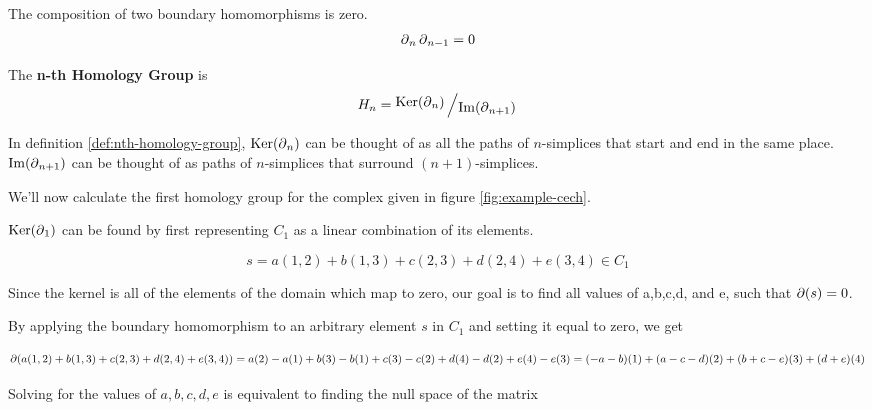 {\begin{theorem}\label{thm:homology-composition}
    The composition of two boundary homomorphisms is zero.
    \begin{align*}
		\operatorname{\partial}_n \operatorname{\partial}_{n-1} = 0
	\end{align*}
\end{theorem}

\begin{definition}\label{def:nth-homology-group}
    The \textbf{n-th Homology Group} is \[H_n = \bigslant{\Ker(\boundary_n)}{\Ima(\boundary_{n+1})}\]
    \cite{fraleigha}
\end{definition}

In definition \ref{def:nth-homology-group}, \(\operatorname{Ker}(\operatorname{\partial}_n)\) can be thought of as all the paths of \(n\)-simplices that start and end in the same place.
\(\operatorname{Im}(\operatorname{\partial}_{n+1})\) can be thought of as paths of \(n\)-simplices that surround \((n+1)\)-simplices.

\begin{figure}
    \scalebox{.8}{
        
    }
    \caption{}
    \label{fig:homology-groups}
\end{figure}

\begin{example}
    We'll now calculate the first homology group for the complex given in figure \ref{fig:example-cech}.

    \(\operatorname{Ker}(\operatorname{\partial}_1)\) can be found by first representing \(C_1\) as a linear combination of its elements.

    \[s = a(1,2) + b(1,3) + c(2,3) + d(2,4) + e(3,4) \in C_1\]

    Since the kernel is all of the elements of the domain which map to zero, our goal is to find all values of a,b,c,d, and e, such that \(\operatorname{\partial}(s) = 0\).

    By applying the boundary homomorphism to an arbitrary element \(s\) in \(C_1\) and setting it equal to zero, we get

    \[\operatorname{\partial}(a(1,2) + b(1,3) + c(2,3) + d(2,4) + e(3,4)) = a(2) - a(1) + b(3) - b(1) + c(3) - c(2) + d(4) - d(2) + e(4) - e(3) = (-a - b)(1) + (a - c - d)(2) + (b + c - e)(3) + (d + e)(4)\]

    Solving for the values of \(a,b,c,d,e\) is equivalent to finding the null space of the matrix


\end{example}}
